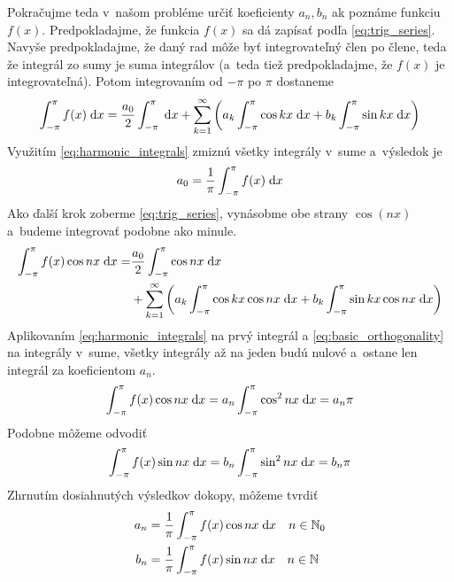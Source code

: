Pokračujme teda v~našom probléme určiť koeficienty $a_n,b_n$ ak
poznáme funkciu $f(x)$.
Predpokladajme, že funkcia $f(x)$ sa dá zapísať podľa
\eqref{eq:trig_series}. Navyše predpokladajme, že daný rad môže byť
integrovateľný člen po člene, teda že integrál zo sumy je suma
integrálov (a~teda tiež predpokladajme, že $f(x)$ je integrovateľná).
Potom integrovaním od $-\pi$ po $\pi$ dostaneme
%
\begin{equation*}
    \int_{-\pi}^{\pi} f(x) \; \mathrm{d} x = \frac{a_0}{2} \int_{-\pi}^{\pi} \; \mathrm{d} x +
        \sum_{k=1}^{\infty} \left( 
            a_k \int_{-\pi}^{\pi} \cos kx  \; \mathrm{d} x +
            b_k \int_{-\pi}^{\pi} \sin kx  \; \mathrm{d} x
        \right)
\end{equation*}
Využitím \eqref{eq:harmonic_integrals} zmiznú všetky integrály v~sume 
a~výsledok je
\begin{equation*}
   a_0 = \frac{1}{\pi} \int_{-\pi}^{\pi} f(x) \; \mathrm{d} x 
\end{equation*}
%
Ako ďalší krok zoberme \eqref{eq:trig_series}, vynásobme obe strany
$\cos(nx)$ a~budeme integrovať podobne ako minule.
%
\begin{equation*}
    \begin{split}
    \int_{-\pi}^{\pi} f(x) \cos nx  \; \mathrm{d} x =& \frac{a_0}{2} \int_{-\pi}^{\pi} \cos nx \; \mathrm{d} x 
    \\ &+
        \sum_{k=1}^{\infty} \left(
            a_k \int_{-\pi}^{\pi} \cos kx \cos nx \; \mathrm{d} x + 
            b_k \int_{-\pi}^{\pi} \sin kx \cos nx \; \mathrm{d} x
        \right)
    \end{split}
\end{equation*}
%
Aplikovaním \eqref{eq:harmonic_integrals} na prvý integrál 
a \eqref{eq:basic_orthogonality} na integrály v~sume, všetky integrály
až na jeden budú nulové a~ostane len integrál za koeficientom $a_n$.
%
\begin{equation*}
    \int_{-\pi}^{\pi} f(x) \cos nx \; \mathrm{d} x = a_n \int_{-\pi}^{\pi} \cos^2 nx \; \mathrm{d} x = a_n \pi
\end{equation*}
%
Podobne môžeme odvodiť
%
\begin{equation*}
    \int_{-\pi}^{\pi} f(x) \sin nx \; \mathrm{d} x = b_n \int_{-\pi}^{\pi} \sin^2 nx \; \mathrm{d} x = b_n \pi
\end{equation*}
%
Zhrnutím dosiahnutých výsledkov dokopy, môžeme tvrdiť
%
\begin{equation}
\begin{split}
    a_n &=  \frac{1}{\pi} \int_{-\pi}^{\pi} f(x) \cos n x \; \mathrm{d} x \quad n\in \mathbb{N}_0 \\
    b_n &=  \frac{1}{\pi} \int_{-\pi}^{\pi} f(x) \sin n x \; \mathrm{d} x \quad n\in \mathbb{N}
\end{split}    
    \label{eq:fourierove_koeficienty}
\end{equation}

